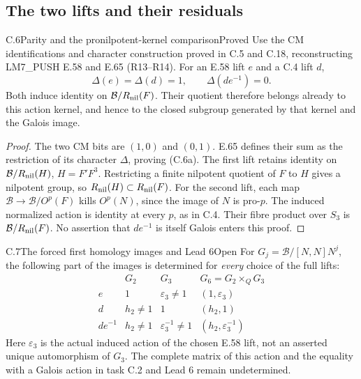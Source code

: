 \subsection{The two lifts and their residuals}

\begin{statement}{C.6}{Parity and the pronilpotent-kernel comparison}{Proved}
Use the CM identifications and character construction
proved in C.5 and C.18, reconstructing
LM7\_PUSH E.58 and E.65 (R13--R14).
For an E.58 lift \(e\) and a C.4 lift \(d\),
\[
 \Delta(e)=\Delta(d)=1,\qquad \Delta(de^{-1})=0.
 \tag{C.6a}
\]
Both induce identity on \(\mathcal B/R_{\rm nil}(F)\).
Their quotient therefore belongs already to this action
kernel, and hence to the closed subgroup generated by that
kernel and the Galois image.
\end{statement}
\begin{proof}
The two CM bits are \((1,0)\) and \((0,1)\).
E.65 defines their sum as the restriction of its character
\(\Delta\), proving (C.6a).
The first lift retains identity on
\(\mathcal B/R_{\rm nil}(H)\), \(H=F'F^3\).
Restricting a finite nilpotent quotient of \(F\) to \(H\)
gives a nilpotent group, so
\(R_{\rm nil}(H)\subset R_{\rm nil}(F)\).
For the second lift, each map
\(\mathcal B\to\mathcal B/O^p(F)\) kills \(O^p(N)\),
since the image of \(N\) is pro-\(p\).
The induced normalized action is identity at every \(p\),
as in C.4. Their fibre product over \(S_3\) is
\(\mathcal B/R_{\rm nil}(F)\).
No assertion that \(de^{-1}\) is itself Galois enters
this proof.
\end{proof}

\begin{statement}{C.7}{The forced first homology images and Lead 6}{Open}
For \(G_j=\mathcal B/[N,N]N^j\), the following part of the
images is determined for \emph{every} choice of the full lifts:
\[
\begin{array}{c|c|c|c}
 &G_2&G_3&G_6=G_2\mathbin{\times}_QG_3\\ \hline
 e&1&\varepsilon_3\ne1&(1,\varepsilon_3)\\
 d&h_2\ne1&1&(h_2,1)\\
 de^{-1}&h_2\ne1&\varepsilon_3^{-1}\ne1&(h_2,\varepsilon_3^{-1})
\end{array}
\tag{C.7a}
\]
Here \(\varepsilon_3\) is the actual induced action of the
chosen E.58 lift, not an asserted unique automorphism of \(G_3\).
The complete matrix of this action and the equality with a
Galois action in task C.2 and Lead 6 remain undetermined.
\end{statement}

